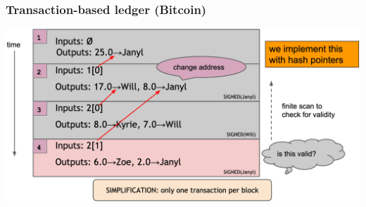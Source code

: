 \documentclass{beamer}
\begin{document}
\begin{frame}
  \frametitle{Transaction-based ledger (Bitcoin)}
  
\centering
	\includegraphics[scale=0.28]{2-1}
\end{frame}
\end{document}
